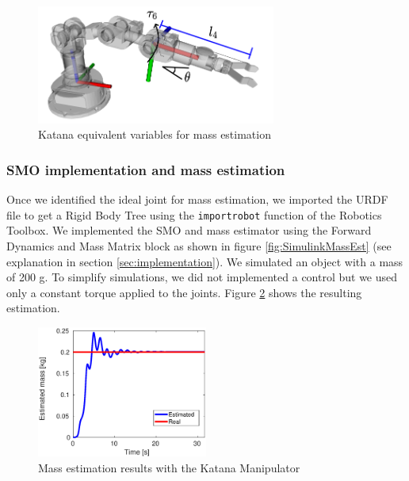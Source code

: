 \documentclass[a4paper, 10pt]{article}
\begin{document}
\begin{figure}
  \centering
  \includegraphics[width=0.7\textwidth]{Figures/katana_joints.png}
  \caption{Katana equivalent variables for mass estimation}
  \label{fig:katana_joints}
\end{figure}

\subsubsection*{SMO implementation and mass estimation}
Once we identified the ideal joint for mass estimation, we imported the URDF file to get a Rigid Body Tree using the \texttt{importrobot} function of the Robotics Toolbox. We implemented the SMO and mass estimator using the Forward Dynamics and Mass Matrix block as shown in figure \ref{fig:SimulinkMassEst} (see explanation in section \ref{sec:implementation}). We simulated an object with a mass of 200 g. To simplify simulations, we did not implemented a control but we used only a constant torque applied to the joints. Figure \ref{fig:katana_results} shows the resulting estimation. 

\begin{figure}
  \centering
  \includegraphics[width=0.5\textwidth]{Figures/katana_mass_est.eps}
  \caption{Mass estimation results with the Katana Manipulator}
  \label{fig:katana_results}
\end{figure}
\end{document}
